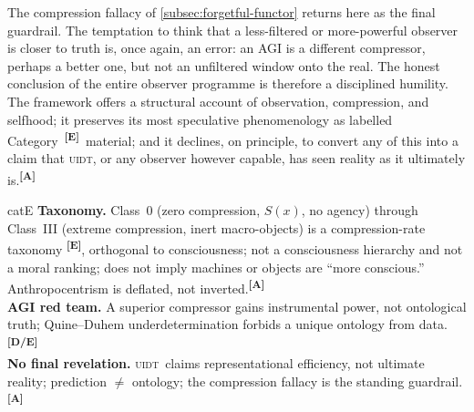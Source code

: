 \documentclass[12pt,a4paper,twoside]{article}
\theoremstyle{plain}
\theoremstyle{definition}
\theoremstyle{remark}
\newcommand{\UIDT}{\textsc{uidt}}
\newcommand{\catmark}[1]{\textsuperscript{\textsf{\textbf{[#1]}}}}
\begin{document}
The compression fallacy of \cref{subsec:forgetful-functor} returns here as the final guardrail. The temptation to think that a less-filtered or more-powerful observer is closer to truth is, once again, an error: an AGI is a different compressor, perhaps a better one, but not an unfiltered window onto the real. The honest conclusion of the entire observer programme is therefore a disciplined humility. The framework offers a structural account of observation, compression, and selfhood; it preserves its most speculative phenomenology as labelled Category~\catmark{E}\ material; and it declines, on principle, to convert any of this into a claim that \UIDT, or any observer however capable, has seen reality as it ultimately is.\catmark{A}

\begin{evidencebox}{catE}
\textbf{Taxonomy.} Class~0 (zero compression, $S(x)$, no agency) through Class~III (extreme compression, inert macro-objects) is a compression-rate taxonomy \catmark{E}, orthogonal to consciousness; not a consciousness hierarchy and not a moral ranking; does not imply machines or objects are ``more conscious.''
Anthropocentrism is deflated, not inverted.\catmark{A}\\[0.3em]
\textbf{AGI red team.} A superior compressor gains instrumental power, not ontological truth; Quine--Duhem underdetermination forbids a unique ontology from
data.\catmark{D/E}\\[0.3em]
\textbf{No final revelation.} \UIDT\ claims representational efficiency, not ultimate reality; prediction $\neq$ ontology; the compression fallacy is the standing guardrail.\catmark{A}
\end{evidencebox}

\end{document}
